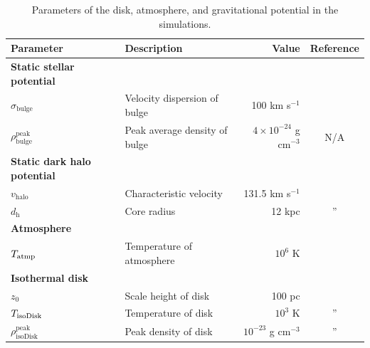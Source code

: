 \documentclass[fleqn,usenatbib,useAMS]{mnras}
\begin{document}
\begin{table}
\raggedright
\caption{Parameters of the disk, atmosphere, and gravitational potential in the simulations.}
\label{table-parameters}
\begin{tabular}{@{}llrc@{}}
\toprule[1pt]\midrule[0.3pt]
Parameter                             & Description                    & Value                                &  Reference                     \\ \midrule
{\bf Static stellar potential }       &                                &                                      &                                \\
$\sigma_{\text{bulge}}$               & Velocity dispersion of bulge   & 100 km s$^{-1}$                      & \citep{velocity-dispersion-MW} \\
$\rho_{\text{bulge}}^{\text{peak}}$   & Peak average density of bulge  & $4\times 10^{-24}$ g cm$^{-3}$       &   N/A                          \\ \hline
{\bf Static dark halo potential }     &                                &                                      &                                \\
$v_{\text{halo}}$                     & Characteristic velocity        & 131.5 km s$^{-1}$                    & \citep{Johnston1995}           \\
$d_{\text{h}}$                        & Core radius                    & 12 kpc                               & \multicolumn{1}{c}{''}         \\ \hline
{\bf Atmosphere }                     &                                &                                      &                                \\
$T_{\text{\text{atmp}}}$              & Temperature of atmosphere      & $10^{6}$ K                           & \citep{temperature-MW}         \\ \hline
{\bf Isothermal disk }                &                                &                                      &                                \\
$z_{0}$                               & Scale height of disk           & 100 pc                               & \citep{peak-ism-density}       \\
$T_{\text{\text{isoDisk}}}$           & Temperature of disk            & $10^{3}$ K                           & \multicolumn{1}{c}{''}         \\
$\rho_{\text{isoDisk}}^{\text{peak}}$ & Peak density of disk           & $10^{-23}$ g cm$^{-3}$               & \multicolumn{1}{c}{''}         \\ \hline

\end{tabular}
\end{table}
\end{document}
